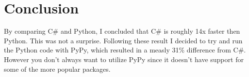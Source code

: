\section*{Conclusion}

By comparing C\# and Python, I concluded that C\# is roughly 14x faster then Python. This was not a surprise. Following these result I decided to try and run the Python code with PyPy, which resulted in a measly 31\% difference from C\#. However you don't always want to utilize PyPy since it doesn't have support for some of the more popular packages. 



